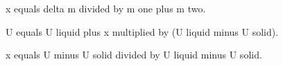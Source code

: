 x equals delta m divided by m one plus m two.  

U equals U liquid plus x multiplied by (U liquid minus U solid).  

x equals U minus U solid divided by U liquid minus U solid.